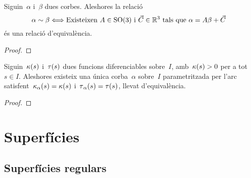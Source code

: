 \documentclass[../../Main.tex]{subfiles}
\begin{document}
	\begin{lemma}
		\label{lemma:Teorema Fonamental de la teoria local de corbes}
		Siguin~\(\alpha\) i~\(\beta\) dues corbes.
		Aleshores la relació
		\[
		    \alpha\sim\beta \Longleftrightarrow \text{Existeixen }A\in\operatorname{SO}(3)\text{ i }\vec{C}\in\mathbb{R}^{3}\text{ tals que }\alpha=A\beta+\vec{C}
		\]
		és una relació d'equivalència.
		\begin{proof}
		\end{proof}
	\end{lemma}
	\begin{theorem}
		\label{thm:Teorema Fonamental de la teoria local del corbes}
		Siguin~\(\operatorname{\kappa}(s)\) i~\(\operatorname{\tau}(s)\) dues funcions diferenciables sobre~\(I\), amb~\(\operatorname{\kappa}(s)>0\) per a tot~\(s\in I\).
		Aleshores existeix una única corba~\(\alpha\) sobre~\(I\) parametritzada per l'arc satisfent~\(\operatorname{\kappa}_{\alpha}(s)=\operatorname{\kappa}(s)\) i~\(\operatorname{\tau}_{\alpha}(s)=\operatorname{\tau}(s)\), llevat d'equivalència.
		\begin{proof}
		\end{proof}
	\end{theorem}
\chapter{Superfícies}
\section{Superfícies regulars}
\end{document}
